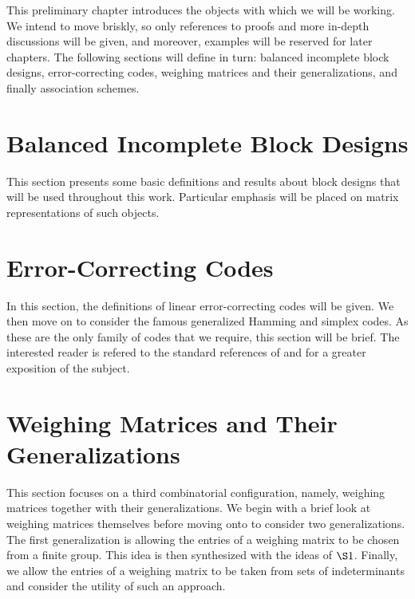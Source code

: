\documentclass[../../main]{subfiles}
\begin{document}
This preliminary chapter introduces the objects with which we will be working.
We intend to move briskly, so only references to proofs and more in-depth discussions
will be given, and moreover, examples will be reserved for later chapters. The following sections will define in turn: balanced incomplete block
designs, error-correcting codes, weighing matrices and their generalizations,
and finally association schemes.

\section{\centering Balanced Incomplete Block Designs}

This section presents some basic definitions and results about block designs
that will be used throughout this work. Particular emphasis will be placed on
matrix representations of such objects. 

\dinkus



\section{\centering Error-Correcting Codes}

In this section, the definitions of linear error-correcting codes will be given. We then move on to consider the famous generalized Hamming and simplex codes. As these are the only family of codes that we require, this section will be brief. The interested reader is refered to the standard references of \cite{pless-book} and \cite{error-correcting-codes-v1} for a greater exposition of the subject.

\dinkus



\section{\centering Weighing Matrices and Their Generalizations}

This section focuses on a third combinatorial configuration, namely, weighing
matrices together with their generalizations. We begin with a brief look at weighing matrices themselves before moving onto to consider two generalizations. The first generalization is allowing the entries of a weighing matrix to be chosen from a finite group. This idea is then synthesized with the ideas of $\S1$. Finally, we allow the entries of a weighing matrix to be taken from sets of indeterminants and consider the utility of such an approach.
\end{document}
